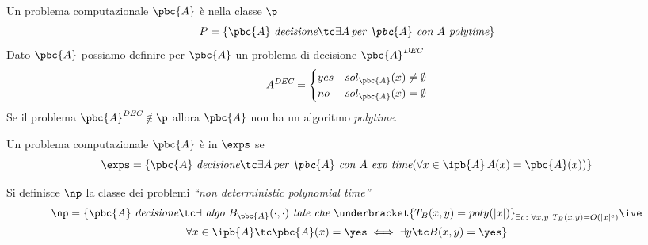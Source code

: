 \begin{definition}[Classe P]
	Un problema computazionale $\pbc{A}$ è nella classe $\p$
	\[P=\{\pbc{A}\ \textit{decisione}\tc \exists A\, \textit{per $\pbc{A}$ con $A$ polytime}\}\]
	Dato $\pbc{A}$ possiamo definire per $\pbc{A}$ un problema di decisione $\pbc{A}^{\textit{DEC}}$
	\begin{equation*}
		A^{\textit{DEC}}=\begin{cases}
			yes & sol_\pbc{A}(x)\ne \emptyset\\
			no & sol_\pbc{A}(x)=\emptyset
		\end{cases}
	\end{equation*}
	Se il problema $\pbc{A}^\textit{DEC}\notin \p$ allora $\pbc{A}$ non ha un algoritmo \textit{polytime}.
\end{definition}

\begin{definition}
	Un problema computazionale $\pbc{A}$ è in $\exps$ se
	\begin{equation*}
		\exps = \{\pbc{A}\ \textit{decisione}\tc \exists A\, \textit{per $\pbc{A}$ con $A$ exp time} (\forall x\in \ipb{A}\, A(x)=\pbc{A}(x))\}
	\end{equation*}
\end{definition}

\begin{definition}[Classe NP]
	Si definisce $\np$ la classe dei problemi \textit{``non deterministic polynomial time''}
	\begin{gather*}
		\np = \{\pbc{A}\ \textit{decisione}\tc\exists\ \textit{algo}\ B_\pbc{A}(\cdot,\cdot)\ \textit{tale che}\ \underbracket{T_B(x,y)=poly(|x|)}_{\exists c\colon \forall x,y\ T_B(x,y)=O(|x|^c) }\ive\\ \forall x \in \ipb{A}\tc \pbc{A}(x)=\yes\iff \exists y\tc B(x,y)=\yes\}
	\end{gather*}
\end{definition}
